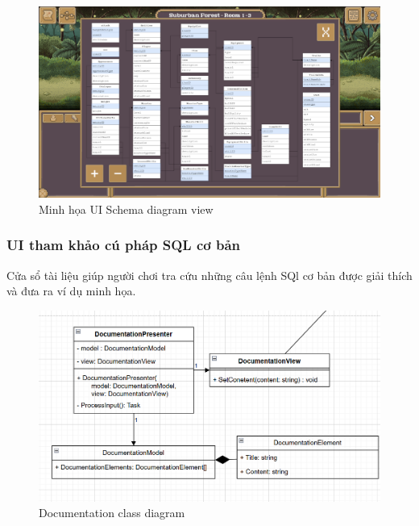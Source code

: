 \begin{figure}[H]
	\centering
	\includegraphics[width=13cm]{Images/SchemaDiagramUi.png}
	\vspace{0.5cm}
	\caption{Minh họa UI Schema diagram view}
\end{figure}

\subsubsection{UI tham khảo cú pháp SQL cơ bản}

Cửa sổ tài liệu giúp người chơi tra cứu những câu lệnh SQl cơ bản được giải thích và đưa ra ví dụ minh họa.

\begin{figure}[H]
	\centering
	\includegraphics[width=13cm]{Images/DocumentationView.png}
	\vspace{0.5cm}
	\caption{Documentation class diagram}
\end{figure}

